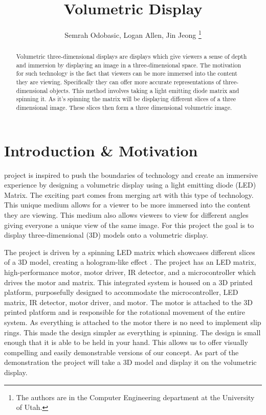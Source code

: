 \documentclass[11pt,journal]{IEEEtran}
\begin{document}
\title{Volumetric Display}

\author{Semrah Odobasic, Logan Allen, Jin Jeong
  \thanks{The authors are in the Computer Engineering
    department at the University of Utah.}
}
\maketitle

\begin{abstract}
 Volumetric three-dimensional displays are displays which give viewers a sense of depth and immersion by displaying an image in a three-dimensional space. The motivation for such technology is the fact that viewers can be more immersed into the content they are viewing. Specifically they can offer more accurate representations of three-dimensional objects. This method involves taking a light emitting diode matrix and spinning it. As it’s spinning the matrix will be displaying different slices of a three dimensional image. These slices then form a three dimensional volumetric image.


\end{abstract}

\section{Introduction \& Motivation}

 project is inspired to push the boundaries of technology and create an immersive experience by designing a volumetric display using a light emitting diode (LED) Matrix. The exciting part comes from merging art with this type of technology. This unique medium allows for a viewer to be more immersed into the content they are viewing. This medium also allows viewers to view for different angles giving everyone a unique view of the same image. For this project the goal is to display three-dimensional (3D) models onto a volumetric display.

The project is driven by a spinning LED matrix which showcases different slices of a 3D model, creating a hologram-like effect \cite{Sun2012ADP}. The project has an LED matrix, high-performance motor, motor driver, IR detector, and a microcontroller which drives the motor and matrix. This integrated system is housed on a 3D printed platform, purposefully designed to accommodate the microcontroller, LED matrix, IR detector, motor driver, and motor. The motor is attached to the 3D printed platform and is responsible for the rotational movement of the entire system. As everything is attached to the motor there is no need to implement slip rings. This made the design simpler as everything is spinning. The design is small enough that it is able to be held in your hand. This allows us to offer visually compelling and easily demonstrable versions of our concept. As part of the demonstration the project will take a 3D model and display it on the volumetric display.
\end{document}
